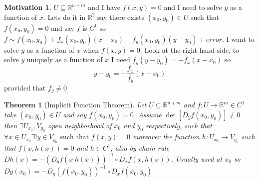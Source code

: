 \documentclass[11pt,openany]{book}
\theoremstyle{plain}
\newtheorem{theorem}{Theorem}[chapter]
\theoremstyle{definition}
\newtheorem{motivation}{Motivation}[chapter]
\theoremstyle{remark}
\newcommand{\R}{\mathbb{R}}
\begin{document}
\begin{motivation}
    $U \subseteq \R^{n+m}$ and I have $f(x,y) = 0$ and I need to solve $y$ as a function of $x$. Lets do it in $\R^2$ say there exists $(x_0,y_0) \in U$ such that $f(x_0,y_0) = 0$ and say $f$ is $C^1$ so $f \sim f(x_0,y_0)+f_x(x_0,y_0)(x-x_0)+f_y(x_0,y_0)(y-y_0)+ error$. I want to solve $y$ as a function of $x$ when $f(x,y) = 0$. Look at the right hand side, to solve $y$ uniquely as a function of $x$ I need $f_y(y-y_0) = -f_x(x-x_0)$ so \[y-y_0 = -\frac{f_x}{f_y}(x-x_0)\] provided that $f_y \ne 0$
\end{motivation}

\begin{theorem}[Implicit Function Theorem]
   Let $U \subseteq \R^{n+m}$ and $f: U \to \R^m \in C^1$ take $(x_0,y_0)\in U$ and say $f(x_0,y_0) = 0$. Assume $\det[ D_yf(x_0,y_0)] \ne 0$ then $\exists U_{x_0}, V_{y_0}$ open neighborhood of $x_0$ and $y_0$ respectively, such that $\forall x \in U_{x_0} \exists! y \in V_{y_0} \text{ such that }  f(x,y) = 0$ moreover the function $h: U_{x_0} \to V_{y_0}$ such that $f(x,h(x)) = 0$ and $h \in C^1$, also by chain rule $Dh(x) = -(D_yf(x_,h(x)))^{-1} \circ D_xf(x,h(x))$. Usually used at $x_0$ so $Dg(x_0) = -D_y(f(x_0,y_0))^{-1} \circ D_xf(x_0,y_0)$
\end{theorem}
\end{document}
